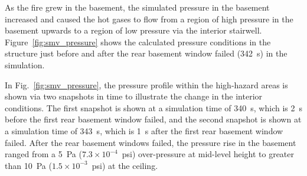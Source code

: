 \documentclass[12pt,oneside]{book}
\begin{document}
As the fire grew in the basement, the simulated pressure in the basement increased and caused the hot gases to flow from a region of high pressure in the basement upwards to a region of low pressure via the interior stairwell. Figure~\ref{fig:smv_pressure} shows the calculated pressure conditions in the structure just before and after the rear basement window failed (342~s) in the simulation.

In Fig.~\ref{fig:smv_pressure}, the pressure profile within the high-hazard areas is shown via two snapshots in time to illustrate the change in the interior conditions. The first snapshot is shown at a simulation time of 340~s, which is 2~s before the first rear basement window failed, and the second snapshot is shown at a simulation time of 343~s, which is 1~s after the first rear basement window failed. After the rear basement windows failed, the pressure rise in the basement ranged from a 5~Pa ($7.3 \times 10^{-4}$~psi) over-pressure at mid-level height to greater than 10~Pa ($1.5 \times 10^{-3}$~psi) at the ceiling.
\end{document}

